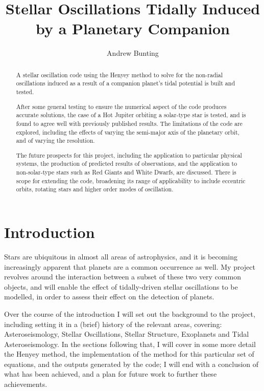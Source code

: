 \documentclass[11pt]{amsart}
\title{Stellar Oscillations Tidally Induced by a Planetary Companion}
\author{Andrew Bunting}
\begin{document}
\maketitle


\begin{abstract}

A stellar oscillation code using the Henyey method to solve for the non-radial oscillations induced as a result of a companion planet's tidal potential is built and tested.

After some general testing to ensure the numerical aspect of the code produces accurate solutions, the case of a Hot Jupiter orbiting a solar-type star is tested, and is found to agree well with previously published results.  The limitations of the code are explored, including the effects of varying the semi-major axis of the planetary orbit, and of varying the resolution.

The future prospects for this project, including the application to particular physical systems, the production of predicted results of observations, and the application to non-solar-type stars such as Red Giants and White Dwarfs, are discussed.  There is scope for extending the code, broadening its range of applicability to include eccentric orbits, rotating stars and higher order modes of oscillation.

\end{abstract}


\section{Introduction} \label{Introduction}

Stars are ubiquitous in almost all areas of astrophysics, and it is becoming increasingly apparent that planets are a common occurrence as well.  My project revolves around the interaction between a subset of these two very common objects, and will enable the effect of tidally-driven stellar oscillations to be modelled, in order to assess their effect on the detection of planets.

Over the course of the introduction I will set out the background to the project, including setting it in a (brief) history of the relevant areas, covering: Asteroseismology, Stellar Oscillations, Stellar Structure, Exoplanets and Tidal Asteroseismology.  In the sections following that, I will cover in some more detail the Henyey method, the implementation of the method for this particular set of equations, and the outputs generated by the code; I will end with a conclusion of what has been achieved, and a plan for future work to further these achievements.
\end{document}
